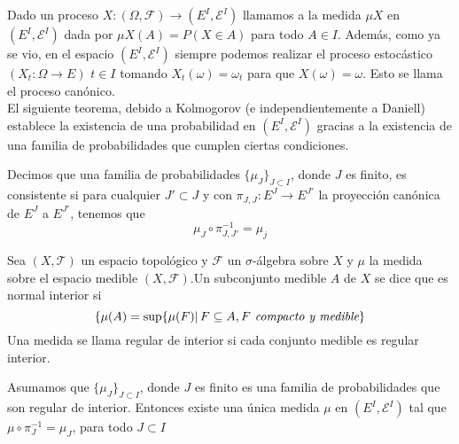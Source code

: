     Dado un proceso $X:(\Omega,\mathscr{F})\rightarrow (E^I,\mathscr{E}^I)$ llamamos a la medida $\mu X$ en $(E^I,\mathscr{E}^I)$ dada por $\mu X(A)= P(X\in A)$ para todo $A\in I$. Además, como ya se vio, en el espacio $(E^I,\mathscr{E}^I)$ siempre podemos realizar el proceso estocástico $(X_t: \Omega \rightarrow E)$ $t\in I$ tomando $X_t(\omega)=\omega_t$ para que $X(\omega)=\omega$. Esto se llama el proceso canónico.
    \\
  El siguiente teorema, debido a Kolmogorov (e independientemente a Daniell) establece la existencia de una probabilidad en $(E^I,\mathscr{E}^I)$ gracias a la existencia de una familia de probabilidades que cumplen ciertas condiciones.
\begin{Def}
    Decimos que una familia de probabilidades $\{\mu_J\}_{J\subset I}$, donde $J$ es finito, es consistente si para cualquier $J'\subset J$ y con $\pi_{J, J}:E^J \rightarrow E^{J'}$ la proyección canónica de $E^J$ a $E^{J'}$, tenemos
     que $$\mu_J \circ \pi_{J,J'}^{-1}= \mu_j$$
\end{Def}
\begin{Def}
    Sea $(X,\mathscr{T})$ un espacio topológico y $\mathscr{F}$ un $\sigma$-álgebra sobre $X$ y $\mu$ la medida sobre el espacio medible $(X, \mathscr{F})$.Un subconjunto medible $A$ de $X$ se dice que es normal interior si
    $$\{\mu(A) = \sup \{\mu(F) |\thinspace F \subseteq A, F \textit{ compacto y medible} \}$$
    Una medida se llama regular de interior si cada conjunto medible es regular interior.
\end{Def}
\begin{Teo}
    Asumamos que $\{\mu_J\}_{J\subset I}$, donde $J$ es finito es una familia de probabilidades que son regular de interior. Entonces existe una única medida $\mu$ en $(E^I, \mathscr{E}^I)$ tal que $\mu\circ\pi_J^{-1}= \mu_J$, para todo $J\subset I$
\end{Teo}